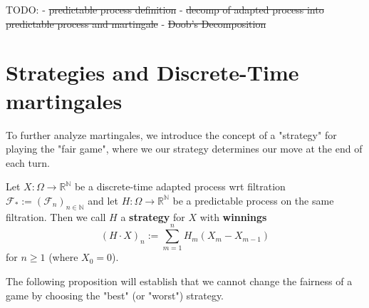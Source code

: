 TODO: 
- \st{predictable process definition}
- \st{decomp of adapted process into predictable process and martingale}
- \st{Doob's Decomposition}

\section{Strategies and Discrete-Time martingales}

To further analyze martingales, we introduce the concept of a "strategy" for playing the "fair game", where we our strategy determines our move at the end of each turn.

\begin{definition}
    Let $X: \Omega \to \mathbb{R}^{\mathbb{N}}$ be a discrete-time adapted process wrt filtration $\mathcal{F}_{*} := (\mathcal{F}_{n})_{n \in \mathbb{N}}$ and let $H: \Omega \to \mathbb{R}^{\mathbb{N}}$ be a predictable process on the same filtration. Then we call \(H\) a \textbf{strategy} for \(X\) with \textbf{winnings} 
    \[(H \cdot X)_{n} := \sum\limits_{m=1}^{n} H_{m} (X_{m} - X_{m-1})\]
    for $n \geq 1$ (where \(X_{0} = 0\)).
\end{definition}

The following proposition will establish that we cannot change the fairness of a game by choosing the "best" (or "worst") strategy.

